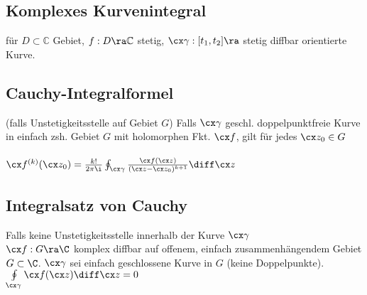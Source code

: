 \documentclass[fs, footer]{latex4ei}
\begin{document}
\begin{sectionbox}
\begin{sectionbox}
\begin{sectionbox}
	\subsection{Komplexes Kurvenintegral}
	für $D \subset \mathbb C$ Gebiet, $f: D \ra \mathbb C$ stetig, $\cx \gamma: [t_1, t_2] \ra $ stetig diffbar orientierte Kurve. \\ 
\end{sectionbox}

\begin{sectionbox}
	\subsection{Cauchy-Integralformel}
	(falls Unstetigkeitsstelle auf Gebiet $G$)
	Falls $\cx \gamma$ geschl. doppelpunktfreie Kurve in einfach zsh. Gebiet $G$ mit holomorphen Fkt. $\cx f$, gilt für jedes $\cx z_0 \in G$\\
	\\
	$\cx f^{(k)}(\cx z_0) = \frac{k!}{2\pi \i} \oint_{\cx \gamma} \frac{\cx f(\cx z)}{(\cx z - \cx z_0)^{k+1}} \diff \cx z$ 
	
	\subsection{Integralsatz von Cauchy}
	Falls keine Unstetigkeitsstelle innerhalb der Kurve $\cx \gamma$\\ 
	$\cx f: G \ra \C$ komplex diffbar auf offenem, einfach zusammenhängendem Gebiet $G \subset \C$. $\cx \gamma$ sei einfach geschlossene Kurve in $G$ (keine Doppelpunkte). \\
	$\oint \limits_{\cx \gamma} \cx f(\cx z) \diff \cx z = 0$
\end{sectionbox}


\end{sectionbox}
\end{sectionbox}
\end{document}
